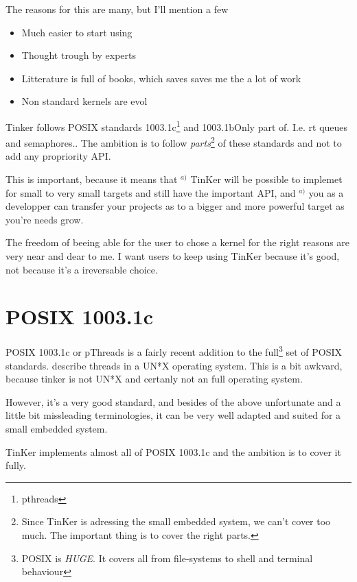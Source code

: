 The reasons for this are many, but I'll mention a few
\begin{itemize}
	\item Much easier to start using
	\item Thought trough by experts 
	\item Litterature is full of books, which saves saves me the a lot of work
	\item Non standard kernels are evol	
\end{itemize}
Tinker follows POSIX standards 1003.1c\footnote{pthreads} and 1003.1b{Only part of. I.e. rt queues and semaphores.}. The ambition is to follow \textit{parts}\footnote{Since TinKer is adressing the small embedded system, we can't cover too much. The important thing is to cover the right parts.} of these standards and not to add any propriority API.

This is important, because it means that $^{a)}$ TinKer will be possible to implemet for small to very small targets and still have the important API, and $^{a)}$ you as a developper can transfer your projects as to a bigger and more powerful target as you're needs grow.

The freedom of beeing able for the user to chose a kernel for the right reasons are very near and dear to me. I want users to keep using TinKer because it's good, not because it's a ireversable choice.

\section{POSIX 1003.1c}
POSIX 1003.1c or pThreads is a fairly recent addition to the full\footnote{POSIX is \textit{HUGE}. It covers all from file-systems to shell and terminal behaviour} set of POSIX standards. describe threads in a UN*X operating system. This is a bit awkvard, because tinker is not UN*X and certanly not an full operating system.

However, it's a very good standard, and besides of the above unfortunate and a little bit missleading terminologies, it can be very well adapted and suited for a small embedded system.

TinKer implements almost all of POSIX 1003.1c and the ambition is to cover it fully.

